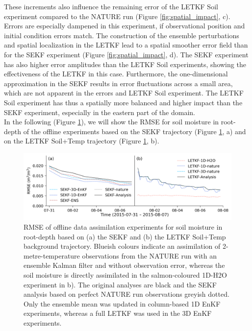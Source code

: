 \documentclass[HESSD, manuscript]{copernicus}
\begin{document}
These increments also influence the remaining error of the LETKF Soil experiment compared to the NATURE run (Figure \ref{fig:spatial_impact}, c).
Errors are especially dampened in this experiment, if observational position and initial condition errors match.
The construction of the ensemble perturbations \citep{hunt_efficient_2007} and spatial localization in the LETKF lead to a spatial smoother error field than for the SEKF experiment (Figure \ref{fig:spatial_impact}, d).
The SEKF experiment has also higher error amplitudes than the LETKF Soil experiments, showing the effectiveness of the LETKF in this case.
Furthermore, the one-dimensional approximation in the SEKF results in error fluctuations across a small area, which are not apparent in the errors and LETKF Soil experiment.
The LETKF Soil experiment has thus a spatially more balanced and higher impact than the SEKF experiment, especially in the eastern part of the domain.\\

In the following (Figure \ref{fig:offline_exp}), we will show the RMSE for soil moisture in root-depth of the offline experiments based on the SEKF trajectory (Figure \ref{fig:offline_exp}, a) and on the LETKF Soil+Temp trajectory (Figure \ref{fig:offline_exp}, b).

\begin{figure}[ht]
	\includegraphics{figures/fig_07_offline_exp.png}
	\caption{
		RMSE of offline data assimilation experiments for soil moisture in root-depth based on (a) the SEKF and (b) the LETKF Soil+Temp background trajectory.
		Blueish colours indicate an assimilation of 2-metre-temperature observations from the NATURE run with an ensemble Kalman filter and without observation error, whereas the soil moisture is directly assimilated in the salmon-coloured 1D-H2O experiment in b).
		The original analyses are black and the SEKF analysis based on perfect NATURE run observations greyish dotted.
		Only the ensemble mean was updated in column-based 1D EnKF experiments, whereas a full LETKF was used in the 3D EnKF experiments.
	}
	\label{fig:offline_exp}
\end{figure}
\end{document}

